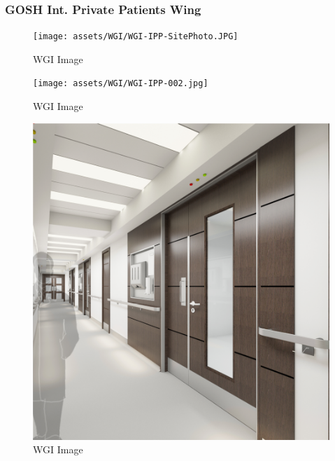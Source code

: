 \documentclass[
]{article}
\begin{document}
\subsubsection{GOSH Int. Private Patients
Wing}\label{gosh-int.-private-patients-wing}

\begin{figure}[H]

{\centering \texttt{[image: assets/WGI/WGI-IPP-SitePhoto.JPG]}

}

\caption{WGI Image}

\end{figure}%
\begin{figure}[H]

{\centering \texttt{[image: assets/WGI/WGI-IPP-002.jpg]}

}

\caption{WGI Image}

\end{figure}%
\begin{figure}[H]

{\centering \includegraphics{assets/WGI/WGI-IPP-006.jpg}

}

\caption{WGI Image}

\end{figure}%
\end{document}
